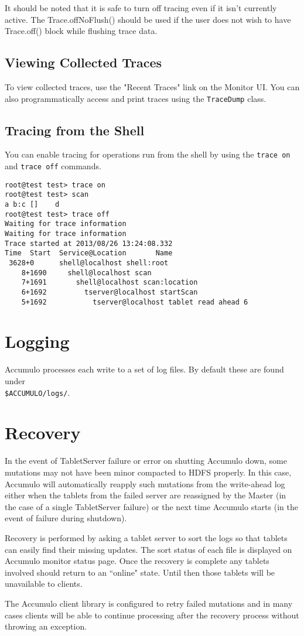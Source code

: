 It should be noted that it is safe to turn off tracing even if it
isn't currently active. The Trace.offNoFlush() should be used if the
user does not wish to have Trace.off() block while flushing trace
data.

\subsection{Viewing Collected Traces}
To view collected traces, use the "Recent Traces" link on the Monitor
UI. You can also programmatically access and print traces using the
\texttt{TraceDump} class.

\subsection{Tracing from the Shell}
You can enable tracing for operations run from the shell by using the
\texttt{trace on} and \texttt{trace off} commands.

\begingroup\fontsize{8pt}{8pt}\selectfont\begin{verbatim}
root@test test> trace on
root@test test> scan
a b:c []    d
root@test test> trace off
Waiting for trace information
Waiting for trace information
Trace started at 2013/08/26 13:24:08.332
Time  Start  Service@Location       Name
 3628+0      shell@localhost shell:root
    8+1690     shell@localhost scan
    7+1691       shell@localhost scan:location
    6+1692         tserver@localhost startScan
    5+1692           tserver@localhost tablet read ahead 6
\end{verbatim}\endgroup

\section{Logging}
Accumulo processes each write to a set of log files. By default these are found under\\
\texttt{\$ACCUMULO/logs/}.

\section{Recovery}

In the event of TabletServer failure or error on shutting Accumulo down, some
mutations may not have been minor compacted to HDFS properly. In this case,
Accumulo will automatically reapply such mutations from the write-ahead log
either when the tablets from the failed server are reassigned by the Master (in the
case of a single TabletServer failure) or the next time Accumulo starts (in the event of
failure during shutdown).

Recovery is performed by asking a tablet server to sort the logs so that tablets can easily find their missing
updates. The sort status of each file is displayed on
Accumulo monitor status page. Once the recovery is complete any
tablets involved should return to an ``online" state. Until then those tablets will be
unavailable to clients.

The Accumulo client library is configured to retry failed mutations and in many
cases clients will be able to continue processing after the recovery process without
throwing an exception.

